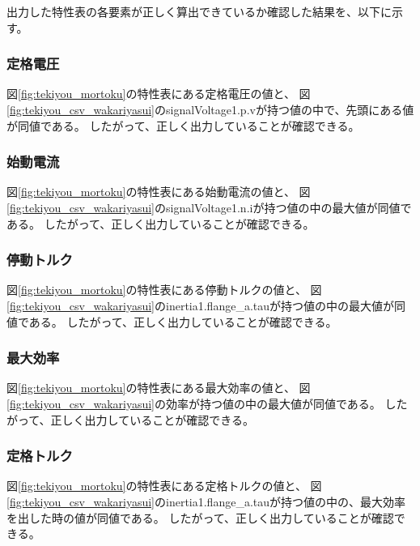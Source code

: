 出力した特性表の各要素が正しく算出できているか確認した結果を、以下に示す。

\subsubsection{定格電圧}
図\ref{fig:tekiyou_mortoku}の特性表にある定格電圧の値と、
図\ref{fig:tekiyou_csv_wakariyasui}のsignalVoltage1.p.vが持つ値の中で、先頭にある値が同値である。
したがって、正しく出力していることが確認できる。

\subsubsection{始動電流}
図\ref{fig:tekiyou_mortoku}の特性表にある始動電流の値と、
図\ref{fig:tekiyou_csv_wakariyasui}のsignalVoltage1.n.iが持つ値の中の最大値が同値である。
したがって、正しく出力していることが確認できる。

\subsubsection{停動トルク}
図\ref{fig:tekiyou_mortoku}の特性表にある停動トルクの値と、
図\ref{fig:tekiyou_csv_wakariyasui}のinertia1.flange\_a.tauが持つ値の中の最大値が同値である。
したがって、正しく出力していることが確認できる。

\subsubsection{最大効率}
図\ref{fig:tekiyou_mortoku}の特性表にある最大効率の値と、
図\ref{fig:tekiyou_csv_wakariyasui}の効率が持つ値の中の最大値が同値である。
したがって、正しく出力していることが確認できる。

\subsubsection{定格トルク}
図\ref{fig:tekiyou_mortoku}の特性表にある定格トルクの値と、
図\ref{fig:tekiyou_csv_wakariyasui}のinertia1.flange\_a.tauが持つ値の中の、最大効率を出した時の値が同値である。
したがって、正しく出力していることが確認できる。

